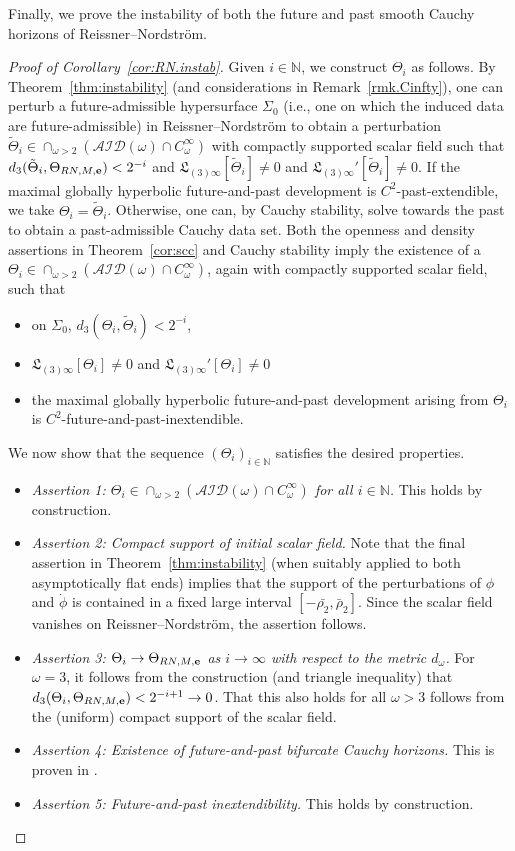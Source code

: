 \documentclass[10pt, reqno]{amsart}
\theoremstyle{definition}
\theoremstyle{remark}
\numberwithin{equation}{section}
\newcommand{\0}{\emptyset}
\newcommand{\Tht}{\Theta}
\newcommand{\omg}{\omega}
\newcommand{\bfe}{{\bf e}}
\newcommand{\calA}{\mathcal A}
\newcommand{\calD}{\mathcal D}
\newcommand{\calI}{\mathcal I}
\newcommand{\e}{\bfe}							%
\begin{document}
Finally, we prove the instability of both the future and past smooth Cauchy horizons of Reissner--Nordstr\"om.
\begin{proof}[Proof of Corollary~\ref{cor:RN.instab}]
Given $i\in \mathbb N$, we construct $\Tht_i$ as follows. By Theorem~\ref{thm:instability} (and considerations in Remark~\ref{rmk.Cinfty}), one can perturb a future-admissible hypersurface $\Sigma_0$ (i.e., one on which the induced data are future-admissible) in Reissner--Nordstr\"om to obtain a perturbation $\tilde{\Tht}_i\in \cap_{\omg>2} (\calA \calI \calD (\omg)\cap C^\infty_\omg)$ with compactly supported scalar field such that $d_3(\tilde{\Tht}_i,\Tht_{RN,M,\e})<2^{-i}$ and $\mathfrak L_{(3)\infty}[\tilde{\Tht}_i]\neq 0$ and $\mathfrak L_{(3)\infty}'[\tilde{\Tht}_i]\neq 0$. If the maximal globally hyperbolic future-and-past development is $C^2$-past-extendible, we take $\Tht_i=\tilde{\Tht}_i$. Otherwise, one can, by Cauchy stability, solve towards the past to obtain a past-admissible Cauchy data set. Both the openness and density assertions in Theorem~\ref{cor:scc} and Cauchy stability imply the existence of a $\Tht_i\in \cap_{\omg>2} (\calA \calI \calD (\omg)\cap C^\infty_\omg)$, again with compactly supported scalar field, such that 
\begin{itemize}
\item on $\Sigma_0$, $d_3(\Tht_i,\tilde{\Tht}_i)<2^{-i}$,
\item $\mathfrak L_{(3)\infty}[{\Tht}_i]\neq 0$ and $\mathfrak L_{(3)\infty}'[{\Tht}_i]\neq 0$
\item the maximal globally hyperbolic future-and-past development arising from $\Tht_i$ is $C^2$-future-and-past-inextendible.
\end{itemize}
We now show that the sequence $(\Tht_i)_{i\in \mathbb N}$ satisfies the desired properties.
\begin{itemize}
\item \emph{Assertion 1: $\Tht_i\in \cap_{\omg>2} (\calA \calI \calD (\omg)\cap C^\infty_\omg)$ for all $i\in \mathbb N$.} This holds by construction.
\item \emph{Assertion 2: Compact support of initial scalar field.} Note that the final assertion in Theorem~\ref{thm:instability} (when suitably applied to both asymptotically flat ends) implies that the support of the perturbations of $\phi$ and $\dot{\phi}$ is contained in a fixed large interval $[-\bar{\rho_2}, \bar{\rho}_2]$. Since the scalar field vanishes on Reissner--Nordstr\"om, the assertion follows.
\item \emph{Assertion 3: $\Tht_i\to \Tht_{RN, M, \e}$ as $i\to \infty$ with respect to the metric $d_\omg$.} For $\omg=3$, it follows from the construction (and triangle inequality) that $d_3(\Tht_i,\Tht_{RN,M,\e})<2^{-i+1}\to 0$. That this also holds for all $\omg>3$ follows from the (uniform) compact support of the scalar field.
\item \emph{Assertion 4: Existence of future-and-past bifurcate Cauchy horizons.} This is proven in \cite{D3}.
\item \emph{Assertion 5: Future-and-past inextendibility.} This holds by construction. \qedhere
\end{itemize}
\end{proof}
\end{document}
